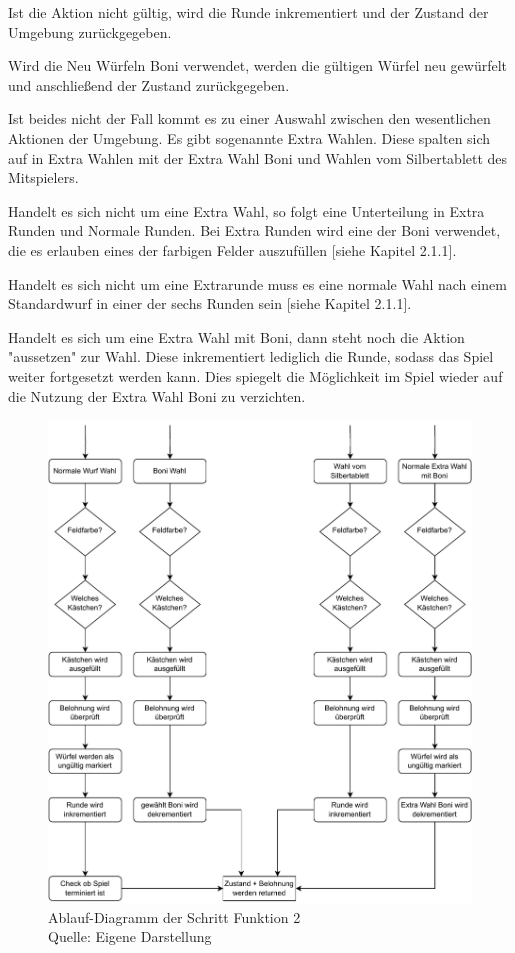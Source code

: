 Ist die Aktion nicht gültig, wird die Runde inkrementiert und der Zustand der Umgebung zurückgegeben.

Wird die Neu Würfeln Boni verwendet, werden die gültigen Würfel neu gewürfelt und anschließend der Zustand zurückgegeben.

Ist beides nicht der Fall kommt es zu einer Auswahl zwischen den wesentlichen Aktionen der Umgebung. Es gibt sogenannte Extra Wahlen. Diese spalten sich auf in Extra Wahlen mit der Extra Wahl Boni und Wahlen vom Silbertablett des Mitspielers.

Handelt es sich nicht um eine Extra Wahl, so folgt eine Unterteilung in Extra Runden und Normale Runden. Bei Extra Runden wird eine der Boni verwendet, die es erlauben eines der farbigen Felder auszufüllen [siehe Kapitel 2.1.1].

Handelt es sich nicht um eine Extrarunde muss es eine normale Wahl nach einem Standardwurf in einer der sechs Runden sein [siehe Kapitel 2.1.1].

Handelt es sich um eine Extra Wahl mit Boni, dann steht noch die Aktion "aussetzen" zur Wahl. Diese inkrementiert lediglich die Runde, sodass das Spiel weiter fortgesetzt werden kann. Dies spiegelt die Möglichkeit im Spiel wieder auf die Nutzung der Extra Wahl Boni zu verzichten.\\

\begin{figure}[H]
	\includegraphics[width=1\textwidth]{Bilder/step2.drawio} 
	\caption[Ablauf-Diagramm der Schritt Funktion 2]{Ablauf-Diagramm der Schritt Funktion 2\\ Quelle: Eigene Darstellung}
\end{figure}

